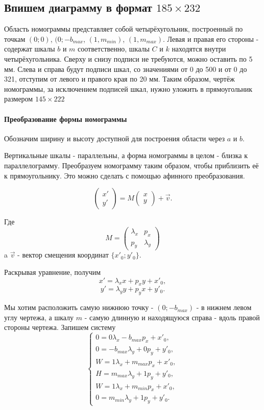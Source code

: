 \subsection{Впишем диаграмму в формат $185 \times 232$}

Область номограммы представляет собой четырёхугольник, построенный по точкам
$(0; 0)$, $(0; -b_{max}$, $(1, m_{min})$, $(1, m_{max})$.
Левая и правая его стороны - содержат шкалы $b$ и $m$ соответственно, шкалы $C$ и $k$ находятся внутри четырёхугольника.
Сверху и снизу подписи не требуются, можно оставить по 5 мм.
Слева и справа будут подписи шкал, со значениями от 0 до 500 и от 0 до 321, отступим от левого и правого края по 20 мм.
Таким образом, чертёж номограммы, за исключением подписей шкал, нужно уложить в прямоугольник размером $145 \times 222$

\paragraph{Преобразование формы номограммы}

Обозначим ширину и высоту доступной для построения области через $a$ и $b$.

Вертикальные шкалы - параллельны, а форма номограммы в целом - близка к параллелограмму.
Преобразуем номограмму таким образом, чтобы приблизить её к прямоугольнику.
Это можно сделать с помощью афинного преобразования.

$$
\begin{pmatrix}
	x' \\
	y'
\end{pmatrix}
= M
\begin{pmatrix}
	x \\
	y
\end{pmatrix}
+
\vec{v}.
$$

Где 
$$M = \begin{pmatrix}
	\lambda_x & p_x \\
	p_y & \lambda_y
\end{pmatrix}
$$
a $\vec{v}$ - вектор смещения координат $\{x'_0; y'_0\}$.

Раскрывая уравнение, получим
$$x' = \lambda_x x + p_x y + x'_0,$$
$$y' = \lambda_y y + p_y x + y'_0.$$

Мы хотим расположить самую нижнюю точку - $(0; -b_{max})$ - в нижнем левом углу чертежа, а шкалу $m$ - самую длинную и находящуюся справа - вдоль правой стороны чертежа.
Запишем систему
$$
\left\{
\begin{gathered}
	0 = 0 \lambda_x -b_{max} p_x + x'_0, \\
	0 = -b_{max} \lambda_y + 0 p_y + y'_0, \\
	W = 1 \lambda_x + m_{max} p_x + x'_0, \\
	H = m_{max} \lambda_y + 1 p_y + y'_0, \\
	W = 1 \lambda_x + m_{min} p_x + x'_0,\\
	0 = m_{min} \lambda_y + 1 p_y + y'_0.
\end{gathered}
\right.
$$


